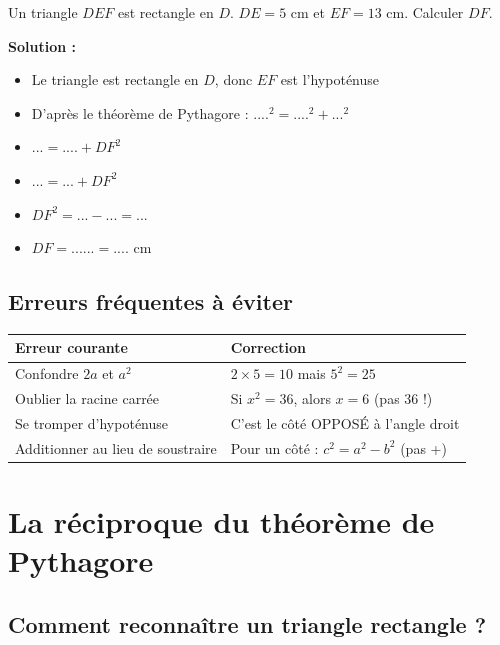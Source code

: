 \begin{examplebox}[]
	Un triangle $DEF$ est rectangle en $D$. $DE = 5$ cm et $EF = 13$ cm. Calculer $DF$.
	
	\textbf{Solution :}
	\begin{itemize}
		\item Le triangle est rectangle en $D$, donc $EF$ est l'hypoténuse
		\item D'après le théorème de Pythagore : $....^2 = ....^2 + ...^2$
		\item $... = .... + DF^2$
		\item $... = ... + DF^2$
		\item $DF^2 = ... - ... = ...$
		\item $DF = ...... = ....$ cm
	\end{itemize}
\end{examplebox}

\subsection{Erreurs fréquentes à éviter}

\begin{remarkbox}
	\begin{center}
		\begin{tabular}{|l|l|}
			\hline
			\textbf{Erreur courante} & \textbf{Correction} \\
			\hline
			Confondre $2a$ et $a^2$ & $2 \times 5 = 10$ mais $5^2 = 25$ \\
			\hline
			Oublier la racine carrée & Si $x^2 = 36$, alors $x = 6$ (pas 36 !) \\
			\hline
			Se tromper d'hypoténuse & C'est le côté OPPOSÉ à l'angle droit \\
			\hline
			Additionner au lieu de soustraire & Pour un côté : $c^2 = a^2 - b^2$ (pas +) \\
			\hline
		\end{tabular}
	\end{center}
\end{remarkbox}
\section{La réciproque du théorème de Pythagore}

\subsection{Comment reconnaître un triangle rectangle ?}


